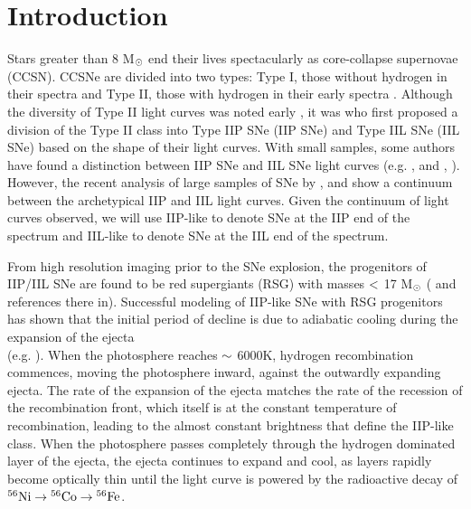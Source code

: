 \documentclass[a4paper,fleqn,usenatbib]{mnras}
\newcommand{\msun}{M$\rm{_{\odot}}$ }
\begin{document}
\section{Introduction}
Stars greater than 8 \msun end their lives spectacularly as core-collapse supernovae (CCSN). 
CCSNe are divided into two types: Type I, those without hydrogen in their spectra and Type II, those with hydrogen in their early spectra \citep{1941minkowski}.
Although the diversity of Type II light curves was noted early \citep{1964minkowski, 1967pskovskii}, it was \citet{1979barbon} who first proposed a division of the Type II class into Type IIP SNe (IIP SNe) and Type IIL SNe (IIL SNe) based on the shape of their light curves.
With small samples, some authors have found a distinction between IIP SNe and IIL SNe light curves  (e.g. \citealt{1993patat}, and \citealt{1994patat}, \citealt{2012arcavi}).
However, the recent analysis of large samples of SNe by \citet{2014anderson, 2014faran,2015sanders,2016valenti,2016galbany}, and \citet{2016rubin} show a continuum between the archetypical IIP and IIL light curves. 
Given the continuum of light curves observed, we will use IIP-like to denote SNe at the IIP end of the spectrum and IIL-like to denote SNe at the IIL end of the spectrum.

From high resolution imaging prior to the SNe explosion, the progenitors of IIP/IIL SNe are found to be red supergiants (RSG) with masses $\rm{<}$ 17  \msun (\citealt{2015smartt} and references there in).
Successful modeling of IIP-like SNe with RSG progenitors has shown that the initial period of decline is due to adiabatic cooling during the expansion of the ejecta 
\\(e.g. \citealt{1971grassberg,1977falk,1993blinnikov,2009kasen}).  %
When the photosphere reaches $\rm{\sim}$ 6000K, hydrogen recombination commences, moving the photosphere inward, against the outwardly expanding ejecta. 
The rate of the expansion of the ejecta matches the rate of the recession of the recombination front, which itself is at the constant temperature of recombination, leading to the almost constant brightness that define the IIP-like class.
When the photosphere passes completely through the hydrogen dominated layer of the ejecta, the ejecta continues to expand and cool, as layers rapidly become optically thin until the light curve is powered by the radioactive decay of $\rm{{}^{56}Ni \rightarrow {}^{56}Co \rightarrow {}^{56}Fe}$.
\end{document}
